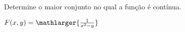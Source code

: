
Determine o maior conjunto no qual a função é contínua.

\item $ F(x,y)=\mathlarger{\frac{1}{x^2-y}}$
